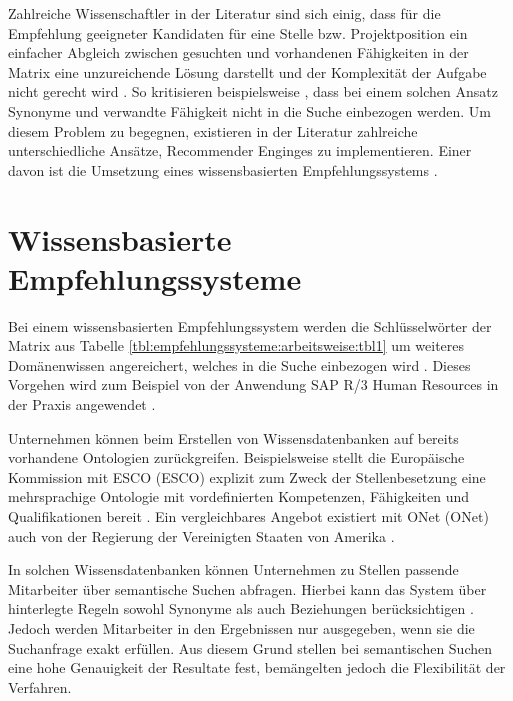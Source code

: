 Zahlreiche Wissenschaftler in der Literatur sind sich einig, dass für die Empfehlung geeigneter Kandidaten für eine Stelle bzw. Projektposition ein einfacher Abgleich zwischen gesuchten und vorhandenen Fähigkeiten in der Matrix eine unzureichende Lösung darstellt \cite[S. 1]{enhancingERecruitment:2012}\cite[S. 1]{faerber:2003}\cite[S. 2]{prospect:2010} und der Komplexität der Aufgabe nicht gerecht wird \cite[S. 1]{malinowski:2008}. So kritisieren beispielsweise \textcite[S. 1f.]{mitre:2014}, dass bei einem solchen Ansatz Synonyme und verwandte Fähigkeit nicht in die Suche einbezogen werden. Um diesem Problem zu begegnen, existieren in der Literatur zahlreiche unterschiedliche Ansätze, Recommender Enginges zu implementieren. Einer davon ist die Umsetzung eines wissensbasierten Empfehlungssystems \cite[S. 2f.]{dwivedi:2017}.

\section{Wissensbasierte Empfehlungssysteme}
\label{ch:empfehlungssysteme:wissensbasierteAnsaetze}
Bei einem wissensbasierten Empfehlungssystem werden die Schlüsselwörter der Matrix aus Tabelle \ref{tbl:empfehlungssysteme:arbeitsweise:tbl1} um weiteres Domänenwissen angereichert, welches in die Suche einbezogen wird \cite[S. 168f.]{recommenderSystems:2016}. Dieses Vorgehen wird zum Beispiel von der Anwendung SAP R/3 Human Resources in der Praxis angewendet \cite[S. 2]{malinowski:2006}.

Unternehmen können beim Erstellen von Wissensdatenbanken auf bereits vorhandene Ontologien zurückgreifen. Beispielsweise stellt die Europäische Kommission mit \acs{ESCO} (\acl{ESCO}) explizit zum Zweck der Stellenbesetzung eine mehrsprachige Ontologie mit vordefinierten Kompetenzen, Fähigkeiten und Qualifikationen bereit \cite[S. 1ff.]{leVrang:2014}. Ein vergleichbares Angebot existiert mit \acs{ONet} (\acl{ONet}) auch von der Regierung der Vereinigten Staaten von Amerika \cite[S. 2]{aCombinedRepresentation:2018}.

In solchen Wissensdatenbanken können Unternehmen zu Stellen passende Mitarbeiter über semantische Suchen abfragen. Hierbei kann das System über hinterlegte Regeln sowohl Synonyme als auch Beziehungen berücksichtigen \cite[S. 2f.]{singto:2013}. Jedoch werden Mitarbeiter in den Ergebnissen nur ausgegeben, wenn sie die Suchanfrage exakt erfüllen. Aus diesem Grund stellen \textcite[S. 3]{bianchini:2008} bei semantischen Suchen eine hohe Genauigkeit der Resultate fest, bemängelten jedoch die Flexibilität der Verfahren.

